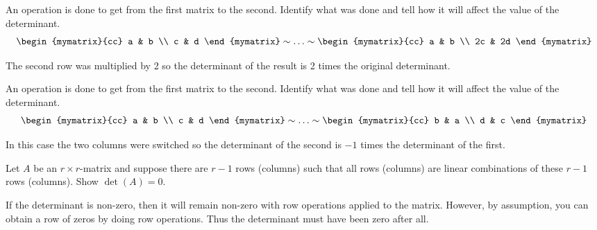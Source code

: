 \begin{enumialphparenastyle}
\begin{ex} An operation is done to get from the first matrix to the second.
Identify what was done and tell how it will affect the value of the
determinant. 
\begin{equation*}
\begin{mymatrix}{cc}
a & b \\
c & d
\end{mymatrix} \sim \ldots \sim \begin{mymatrix}{cc}
a & b \\
2c & 2d
\end{mymatrix}
\end{equation*}
\begin{sol}
The second row was multiplied by 2 so the determinant of the result is 2
times the original determinant.
\end{sol}
\end{ex}

\begin{ex} An operation is done to get from the first matrix to the second.
Identify what was done and tell how it will affect the value of the
determinant. 
\begin{equation*}
\begin{mymatrix}{cc}
a & b \\
c & d
\end{mymatrix} \sim \ldots \sim \begin{mymatrix}{cc}
b & a \\
d & c
\end{mymatrix}
\end{equation*}
\begin{sol}
In this case the two columns were switched so the determinant of the second
is $-1$ times the determinant of the first.
\end{sol}
\end{ex}


\begin{ex} Let $A$ be an $r\times r$-matrix and suppose there are $r-1$ rows
(columns) such that all rows (columns) are linear combinations of these $r-1$
rows (columns). Show $\det (A) =0$. 
\begin{sol}
If the determinant is non-zero, then it will remain non-zero with row operations applied to the matrix.
However, by assumption, you can obtain a row of zeros by doing row
operations. Thus the determinant must have been zero after all.
\end{sol}
\end{ex}


\end{enumialphparenastyle}
